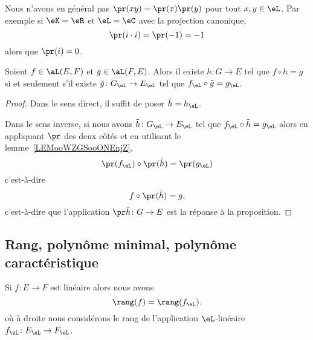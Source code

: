 \begin{remark}
    Nous n'avons en général pas \( \pr(xy)=\pr(x)\pr(y)\) pour tout \( x,y\in \eL\). Par exemple si \( \eK=\eR\) et \( \eL=\eC\) avec la projection canonique,
    \begin{equation}
        \pr(i\cdot i)=\pr(-1)=-1
    \end{equation}
    alors que \( \pr(i)=0\).
\end{remark}

\begin{proposition}
    Soient \( f\in\aL(E,F)\) et \( g\in\aL(F,E)\). Alors il existe \( h\colon G\to E\) tel que \( f\circ h=g\) si et seulement s'il existe \( \tilde g\colon G_{\eL}\to E_{\eL}\) tel que \( f_{\eL}\circ \tilde g=g_{\eL}\).
\end{proposition}

\begin{proof}
    Dans le sens direct, il suffit de poser \( \tilde h=h_{\eL}\).

    Dans le sens inverse, si nous avons \( \tilde h\colon G_{\eL}\to E_{\eL}\) tel que \( f_{\eL}\circ\tilde h=g_{\eL}\) alors en appliquant \( \pr\) des deux côtés et en utilisant le lemme~\ref{LEMooWZGSooONEnjZ},
    \begin{equation}
        \pr(f_{\eL})\circ\pr(\tilde h)=\pr(g_{\eL})
    \end{equation}
    c'est-à-dire
    \begin{equation}
        f\circ\pr(\tilde h)=g,
    \end{equation}
    c'est-à-dire que l'application \( \pr\tilde h\colon G\to E\) est la réponse à la proposition.
\end{proof}

\subsection{Rang, polynôme minimal, polynôme caractéristique}

\begin{proposition}     \label{PROPooJFQDooZSsxMf}
    Si \( f\colon E\to F\) est linéaire alors nous avons
    \begin{equation}
        \rang(f)=\rang(f_{\eL}).
    \end{equation}
    où à droite nous considérons le rang de l'application \( \eL\)-linéaire \( f_{\eL}\colon E_{\eL}\to F_{\eL}\).
\end{proposition}

